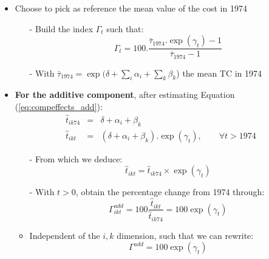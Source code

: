 \documentclass[10 pt,Helvetica, french]{beamer}
\begin{document}
\begin{frame}
\begin{itemize}
\item Choose to pick as reference the mean value of the cost in 1974
\begin{itemize}
\item[-] Build the index $\Gamma_t$ such that:
\footnotesize
\begin{equation*}
 \Gamma_t= 100.\frac {\bar{\tau}_{1974}.\exp(\gamma_t)-1} {\bar{\tau}_{1974}-1}
\end{equation*}
\item[-] With $\bar{\tau}_{1974} = \exp(\delta + \sum_i \alpha_i + \sum_k \beta_k$) the mean TC in 1974 \vspace{0.2cm}
\end{itemize}
\item \textbf{For the additive component}, after estimating Equation (\ref{eq:compeffects_add}):
\footnotesize
\begin{eqnarray*}
\widehat{t}_{ik74}&= & \delta + \alpha_i+ \beta_k \\
\widehat{t}_{ikt}&=&\left(\delta + \alpha_i+ \beta_k\right).\exp(\gamma_t),\qquad \forall t > 1974
\end{eqnarray*}
\normalsize

\begin{itemize}
\item[-] From which we deduce: 
$$\widehat{t}_{ikt} = \widehat{t}_{ik74} \times \exp(\gamma_t)$$
\item[-] With $t >0$, obtain the percentage change from 1974 through:
\footnotesize
\begin{equation*}
\Gamma^{add}_{ikt} = 100\frac{\widehat{t}_{ikt}}{\widehat{t}_{ik74}} = 100\exp(\gamma_t)
\end{equation*}
\normalsize
\item Independent of the $i,k$ dimension, such that we can rewrite:
$$\Gamma^{add}  = 100\exp(\gamma_t) $$
\end{itemize}
\end{itemize}
\hyperlink{slide_compeffects}{}
\end{frame}
\end{document}
